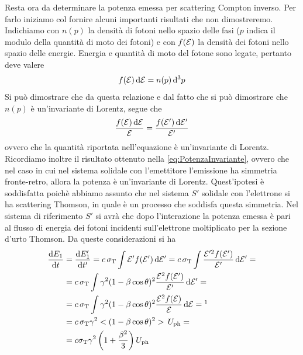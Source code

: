 Resta ora da determinare la potenza emessa per scattering Compton inverso. Per farlo iniziamo col fornire alcuni importanti risultati che non dimostreremo. Indichiamo con $n(p)$ la densità di fotoni nello spazio delle fasi ($p$ indica il modulo della quantità di moto dei fotoni) e con $f(\mathcal{E})$ la densità dei fotoni nello spazio delle energie. Energia e quantità di moto del fotone sono legate, pertanto deve valere 
\begin{equation}
f(\mathcal{E}) \,\mathrm{d} \mathcal{E} = n(p)\,\mathrm{d}^3 p
\end{equation}
Si può dimostrare che da questa relazione e dal fatto che si può dimostrare che $n(p)$ è un'invariante di Lorentz, segue che 
\begin{equation}
\dfrac{f(\mathcal{E}) \,\mathrm{d} \mathcal{E} }{\mathcal{E}} = \dfrac{f(\mathcal{E}') \,\mathrm{d} \mathcal{E}' }{\mathcal{E}'}
\end{equation}
ovvero che la quantità riportata nell'equazione è un'invariante di Lorentz. Ricordiamo inoltre il risultato ottenuto nella \ref{eq:PotenzaInvariante}, ovvero che nel caso in cui nel sistema solidale con l'emettitore l'emissione ha simmetria fronte-retro, allora la potenza è un'invariante di Lorentz. Quest'ipotesi è soddisfatta poichè abbiamo assunto che nel sistema $S'$ solidale con l'elettrone si ha scattering Thomson, in quale è un processo che soddisfa questa simmetria.
Nel sistema di riferimento $S'$ si avrà che dopo l'interazione la potenza emessa è pari al flusso di energia dei fotoni incidenti sull'elettrone moltiplicato per la sezione d'urto Thomson. Da queste considerazioni si ha
\begin{align*}
\der{E_1}{t} &= \der{E'_1}{t'} = c\,\sigma_\mathrm{T}\int\ecor' f(\ecor')\,\dd\ecor' = 
c\,\sigma_\mathrm{T}\int \dfrac{\ecor'^2 f(\ecor')}{\ecor'}\,\dd\ecor' = \\
&= c\,\sigma_\mathrm{T}\int \gamma^2(1-\beta\cos\theta)^2 \dfrac{\ecor^2 f(\ecor')}{\ecor'}\,\dd\ecor' = \\
&= c\,\sigma_\mathrm{T}\int \gamma^2(1-\beta\cos\theta)^2 \dfrac{\ecor^2 f(\ecor)}{\ecor}\,\dd\ecor =\footnotemark \\
&=c \,\sigma_\mathrm{T}\gamma^2 <(1-\beta\cos\theta)^2> \, U_\mathrm{ph} = \\
&= c \sigma_\mathrm{T}\gamma^2\tonde{1+\dfrac{\beta^2}{3}} U_\mathrm{ph}
\end{align*}
